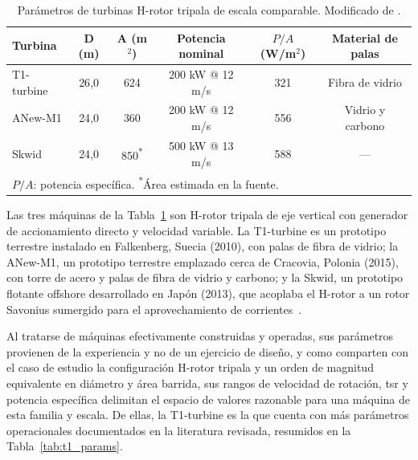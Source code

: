 \begin{table}[H]
    \centering
    \caption[Parámetros de turbinas H-rotor tripala de escala comparable.]{Parámetros de turbinas H-rotor tripala de escala comparable. Modificado de \textcite{Mollerstrom2019}.}
    \label{tab:hrotor_rpm}
    \begin{tabular}{lccccc}
        \hline
        \textbf{Turbina} & \textbf{D (m)} & \textbf{A (m$^2$)} & \textbf{Potencia nominal} & \textbf{$P/A$ (W/m$^2$)} & \textbf{Material de palas}\\
        \hline
        T1-turbine & 26{,}0 & 624 & 200 kW @ 12 m/s & 321 & Fibra de vidrio \\
        ANew-M1    & 24{,}0 & 360 & 200 kW @ 12 m/s & 556 & Vidrio y carbono \\
        Skwid      & 24{,}0 & 850\textsuperscript{*} & 500 kW @ 13 m/s & 588 & --- \\
        \hline
        \multicolumn{6}{p{0.92\textwidth}}{\footnotesize $P/A$: potencia específica. \textsuperscript{*}Área estimada en la fuente.}
    \end{tabular}
\end{table}

Las tres máquinas de la Tabla~\ref{tab:hrotor_rpm} son H-rotor tripala de eje vertical con generador de accionamiento directo y velocidad variable. La T1-turbine es un prototipo terrestre instalado en Falkenberg, Suecia (2010), con palas de fibra de vidrio; la ANew-M1, un prototipo terrestre emplazado cerca de Cracovia, Polonia (2015), con torre de acero y palas de fibra de vidrio y carbono; y la Skwid, un prototipo flotante offshore desarrollado en Japón (2013), que acoplaba el H-rotor a un rotor Savonius sumergido para el aprovechamiento de corrientes~\parencite{Mollerstrom2019}.

Al tratarse de máquinas efectivamente construidas y operadas, sus parámetros provienen de la experiencia y no de un ejercicio de diseño, y como comparten con el caso de estudio la configuración H-rotor tripala y un orden de magnitud equivalente en diámetro y área barrida, sus rangos de velocidad de rotación, \gls{tsr} y potencia específica delimitan el espacio de valores razonable para una máquina de esta familia y escala. De ellas, la T1-turbine es la que cuenta con más parámetros operacionales documentados en la literatura revisada, resumidos en la Tabla~\ref{tab:t1_params}.

